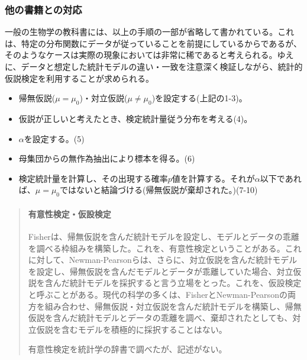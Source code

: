 \documentclass[a4paper,11pt,dvipdfmx]{jsarticle}
\begin{document}
\subsubsection{他の書籍との対応}
一般の生物学の教科書には、以上の手順の一部が省略して書かれている。これは、特定の分布関数にデータが従っていることを前提にしているからであるが、そのようなケースは実際の現象においては非常に稀であると考えられる。ゆえに、データと想定した統計モデルの違い・一致を注意深く検証しながら、統計的仮説検定を利用することが求められる。
\begin{framed}
    \begin{itemize}
        \item 帰無仮説($\mu = \mu_0$)・対立仮説($\mu\neq \mu_0$)を設定する(上記の1-3)。
        \item 仮説が正しいと考えたとき、検定統計量従う分布を考える(4)。
        \item $\alpha$を設定する。(5)
        \item 母集団からの無作為抽出により標本を得る。(6)
        \item 検定統計量を計算し、その出現する確率$p$値を計算する。それが$\alpha$以下であれば、$\mu=\mu_0$ではないと結論づける(帰無仮説が棄却された。)(7-10)
    \end{itemize}
\end{framed}



\begin{mybox}
    \begin{quotation}
    \paragraph{有意性検定・仮設検定\cite{鳥類学における統計学_2018}}
    Fisherは、帰無仮説を含んだ統計モデルを設定し、モデルとデータの乖離を調べる枠組みを構築した。これを、有意性検定ということがある。これに対して、Newman-Pearsonらは、さらに、対立仮説を含んだ統計モデルを設定し、帰無仮説を含んだモデルとデータが乖離していた場合、対立仮説を含んだ統計モデルを採択すると言う立場をとった。これを、仮設検定と呼ぶことがある。現代の科学の多くは、FisherとNewman-Pearsonの両方を組み合わせ、帰無仮説・対立仮説を含んだ統計モデルを構築し、帰無仮説を含んだ統計モデルとデータの乖離を調べ、棄却されたとしても、対立仮説を含むモデルを積極的に採択することはない。

    有意性検定を統計学の辞書で調べたが、記述がない。
    \end{quotation}
\end{mybox}
\end{document}
